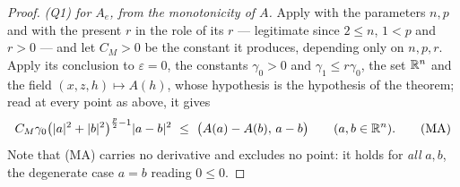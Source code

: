 \begin{proof}
\emph{\textup{(Q1)} for $A_e$, from the monotonicity of $A$.}  Apply
 with the parameters $n,p$ and with the
present $r$ in the role of its $r$ --- legitimate since $2\le n$, $1<p$ and
$r>0$ --- and let $C_M>0$ be the constant it produces, depending only on
$n,p,r$.  Apply its conclusion to $\varepsilon=0$, the constants
$\gamma_0>0$ and $\gamma_1\le r\gamma_0$, the set $\mathbb{R}^n$ and the field
$(x,z,h)\mapsto A(h)$, whose  hypothesis is the
hypothesis of the theorem; read at every point as above, it gives
\[
C_M\gamma_0\bigl(|a|^2+|b|^2\bigr)^{\frac p2-1}|a-b|^2
\ \le\ \bigl(A(a)-A(b),\,a-b\bigr)
\qquad(a,b\in\mathbb{R}^n).
\tag{MA}
\]
Note that (MA) carries no derivative and excludes no point: it holds for
\emph{all} $a,b$, the degenerate case $a=b$ reading $0\le0$.


\end{proof}
